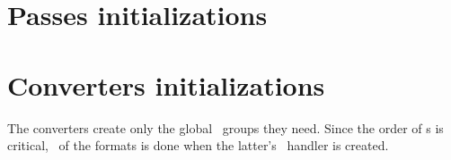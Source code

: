\section{Passes initializations}


\section{Converters initializations}

The converters create only the global \oahRepr\ groups they need. Since the order of \initialization s is critical, \initialization\ of the formats is done when the latter's \insider\ handler is created.

